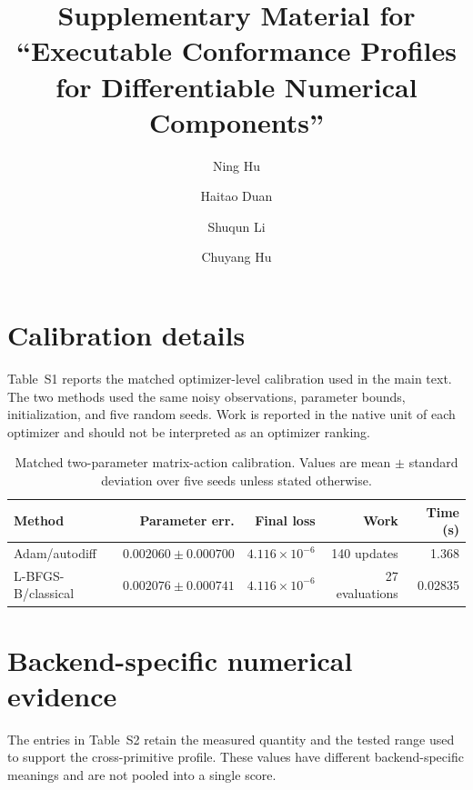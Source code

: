 \documentclass[preprint,12pt]{elsarticle}
\begin{document}
\begin{frontmatter}
\title{Supplementary Material for ``Executable Conformance Profiles for Differentiable Numerical Components''}
\author{Ning Hu}
\author{Haitao Duan}
\author{Shuqun Li}
\author{Chuyang Hu}
\end{frontmatter}

\section{Calibration details}
Table~S1 reports the matched optimizer-level calibration used in the main text. The two methods used the same noisy observations, parameter bounds, initialization, and five random seeds. Work is reported in the native unit of each optimizer and should not be interpreted as an optimizer ranking.

\begin{table}[htbp]
\centering
\caption{Matched two-parameter matrix-action calibration. Values are mean $\pm$ standard deviation over five seeds unless stated otherwise.}
\label{tab:s1}
\small
\setlength{\tabcolsep}{3.5pt}
\begin{tabular}{@{}lrrrr@{}}
\toprule
Method & Parameter err. & Final loss & Work & Time (s)\\
\midrule
Adam/autodiff & $0.002060\pm0.000700$ & $4.116\times10^{-6}$ & 140 updates & 1.368\\
L-BFGS-B/classical & $0.002076\pm0.000741$ & $4.116\times10^{-6}$ & 27 evaluations & 0.02835\\
\bottomrule
\end{tabular}
\end{table}

\section{Backend-specific numerical evidence}
The entries in Table~S2 retain the measured quantity and the tested range used to support the cross-primitive profile. These values have different backend-specific meanings and are not pooled into a single score.
\end{document}
